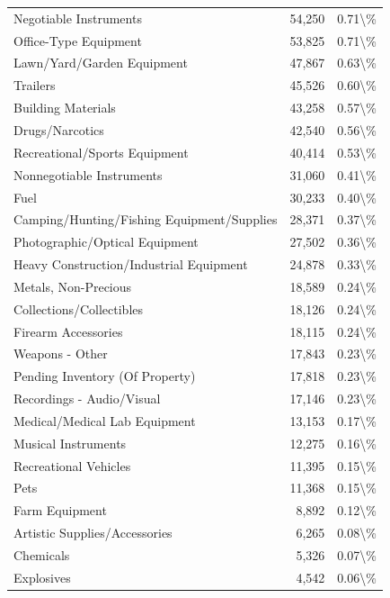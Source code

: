 \documentclass[
  12pt,
  openany]{book}
\begin{document}
\begin{longtable}[t]{lrr}
Negotiable Instruments & 54,250 & 0.71\textbackslash{}\%\\
Office-Type Equipment & 53,825 & 0.71\textbackslash{}\%\\
\addlinespace
Lawn/Yard/Garden Equipment & 47,867 & 0.63\textbackslash{}\%\\
Trailers & 45,526 & 0.60\textbackslash{}\%\\
Building Materials & 43,258 & 0.57\textbackslash{}\%\\
Drugs/Narcotics & 42,540 & 0.56\textbackslash{}\%\\
Recreational/Sports Equipment & 40,414 & 0.53\textbackslash{}\%\\
\addlinespace
Nonnegotiable Instruments & 31,060 & 0.41\textbackslash{}\%\\
Fuel & 30,233 & 0.40\textbackslash{}\%\\
Camping/Hunting/Fishing Equipment/Supplies & 28,371 & 0.37\textbackslash{}\%\\
Photographic/Optical Equipment & 27,502 & 0.36\textbackslash{}\%\\
Heavy Construction/Industrial Equipment & 24,878 & 0.33\textbackslash{}\%\\
\addlinespace
Metals, Non-Precious & 18,589 & 0.24\textbackslash{}\%\\
Collections/Collectibles & 18,126 & 0.24\textbackslash{}\%\\
Firearm Accessories & 18,115 & 0.24\textbackslash{}\%\\
Weapons - Other & 17,843 & 0.23\textbackslash{}\%\\
Pending Inventory (Of Property) & 17,818 & 0.23\textbackslash{}\%\\
\addlinespace
Recordings - Audio/Visual & 17,146 & 0.23\textbackslash{}\%\\
Medical/Medical Lab Equipment & 13,153 & 0.17\textbackslash{}\%\\
Musical Instruments & 12,275 & 0.16\textbackslash{}\%\\
Recreational Vehicles & 11,395 & 0.15\textbackslash{}\%\\
Pets & 11,368 & 0.15\textbackslash{}\%\\
\addlinespace
Farm Equipment & 8,892 & 0.12\textbackslash{}\%\\
Artistic Supplies/Accessories & 6,265 & 0.08\textbackslash{}\%\\
Chemicals & 5,326 & 0.07\textbackslash{}\%\\
Explosives & 4,542 & 0.06\textbackslash{}\%\\

\end{longtable}
\end{document}
